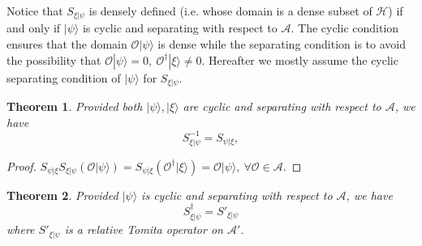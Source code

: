 \documentclass[a4paper,11pt]{article}
\newtheorem{thm}{Theorem}[section]
\newcommand{\ket}[1]{| #1 \rangle } %
\renewcommand{\=}[1]{\stackrel{#1}{=}} %
\def\A{\mathcal{A}}
\def\O{\mathcal{O}}
\def\H{\mathcal{H}}
\begin{document}
Notice that $S_{\xi|\psi}$ is densely defined (i.e. whose domain is a dense subset of $\H$) if and only if $\ket{\psi}$ is cyclic and separating with respect to $\A$. The cyclic condition ensures that the domain $\O\ket{\psi}$ is dense while the separating condition is to avoid the possibility that $\O\ket{\psi}=0,~ \O^\dagger\ket{\xi}\neq 0$. Hereafter we mostly assume the cyclic separating condition of $\ket{\psi}$ for $S_{\xi|\psi}$.

\begin{thm}
	Provided both $\ket{\psi},\ket{\xi}$ are cyclic and separating with respect to $\A$, we have
	\begin{equation}
		S_{\xi|\psi}^{-1}=S_{\psi|\xi},
	\end{equation}
\end{thm}

\begin{proof}
	$S_{\psi|\xi}S_{\xi|\psi}\left(\O\ket{\psi}\right)=S_{\psi|\xi}\left(\O^\dagger \ket{\xi}\right)=\O\ket{\psi},~\forall \O\in\A$.
\end{proof}

\begin{thm}
	Provided $\ket{\psi}$ is cyclic and separating with respect to $\A$, we have
	\begin{equation}
		S^\dagger_{\xi|\psi}=S'_{\xi|\psi}
	\end{equation}
	where $S'_{\xi|\psi}$ is a relative Tomita operator on $\A'$.
\end{thm}
\end{document}
